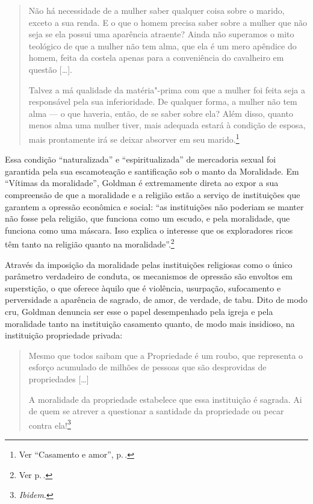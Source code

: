 \begin{quote}
Não há necessidade de a mulher saber
qualquer coisa sobre o marido, exceto a sua renda. E o que o homem
precisa saber sobre a mulher que não seja se ela possui uma aparência
atraente? Ainda não superamos o mito teológico de que a mulher não tem
alma, que ela é um mero apêndice do homem, feita da costela apenas para
a conveniência do cavalheiro em questão {[}\ldots{]}.

Talvez a má qualidade da matéria"-prima com que a mulher foi feita seja a
responsável pela sua inferioridade. De qualquer forma, a mulher não tem
alma --- o que haveria, então, de se saber sobre ela? Além disso, quanto
menos alma uma mulher tiver, mais adequada estará à condição de esposa,
mais prontamente irá se deixar absorver em seu marido.\footnote{Ver ``Casamento e amor'', p.\,\pageref{ref7}.}
\end{quote}

Essa condição ``naturalizada'' e ``espiritualizada'' de mercadoria
sexual foi garantida pela sua escamoteação e santificação sob o manto
da Moralidade. Em ``Vítimas da moralidade'', Goldman é extremamente
direta ao expor a sua compreensão de que a moralidade e a religião estão a
serviço de instituições que garantem a opressão econômica e social:
``as instituições não poderiam se manter não
fosse pela religião, que funciona como um escudo, e pela moralidade, que
funciona como uma máscara. Isso explica o interesse que os exploradores
ricos têm tanto na religião quanto na moralidade''.\footnote{Ver p.\,\pageref{ref8}.} 

Através da
imposição da moralidade pelas instituições religiosas como o único
parâmetro verdadeiro de conduta, os mecanismos de opressão são envoltos
em superstição, o que oferece àquilo que é violência,
usurpação, sufocamento e perversidade a aparência de sagrado, de amor, de
verdade, de tabu. Dito de modo cru, Goldman denuncia ser esse o papel
desempenhado pela igreja e pela moralidade tanto na
instituição casamento quanto, de modo mais insidioso, na
instituição propriedade privada:

\begin{quote}
Mesmo que todos saibam que a
Propriedade é um roubo, que representa o esforço acumulado de milhões de
pessoas que são desprovidas de propriedades {[}\ldots{]}

A moralidade da propriedade estabelece que essa
instituição é sagrada. Ai de quem se atrever a questionar a santidade da
propriedade ou pecar contra ela!\footnote{\textit{Ibidem}.} 
\end{quote}

